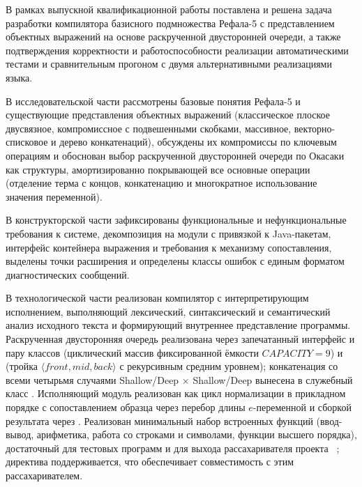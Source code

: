 В рамках выпускной квалификационной работы поставлена и решена задача
разработки компилятора базисного подмножества Рефала-5 с представлением
объектных выражений на основе раскрученной двусторонней очереди, а также
подтверждения корректности и работоспособности реализации автоматическими
тестами и сравнительным прогоном с двумя альтернативными реализациями
языка.

В исследовательской части рассмотрены базовые понятия Рефала-5 и
существующие представления объектных выражений (классическое плоское
двусвязное, компромиссное с подвешенными скобками, массивное,
векторно-списковое и дерево конкатенаций), обсуждены их компромиссы по
ключевым операциям и обоснован выбор раскрученной двусторонней очереди по
Окасаки~\cite{okasaki_pfds} как структуры, амортизированно покрывающей все
основные операции (отделение терма с концов, конкатенацию и многократное
использование значения переменной).

В конструкторской части зафиксированы функциональные и нефункциональные
требования к системе, декомпозиция на модули с привязкой к Java-пакетам,
интерфейс контейнера выражения и требования к механизму сопоставления, выделены
точки расширения и определены классы ошибок с единым форматом
диагностических сообщений.

В технологической части реализован компилятор с интерпретирующим исполнением,
выполняющий лексический,
синтаксический и семантический анализ исходного текста и формирующий
внутреннее представление программы. Раскрученная двусторонняя очередь
реализована через запечатанный интерфейс  и пару классов
 (циклический массив фиксированной ёмкости
\(CAPACITY=9\)) и  (тройка \(\langle front, mid, back
\rangle\) с рекурсивным средним уровнем); конкатенация со всеми четырьмя
случаями Shallow/Deep $\times$ Shallow/Deep вынесена в служебный класс
. Исполняющий модуль реализован как цикл нормализации в
прикладном порядке с сопоставлением образца через перебор длины
\(e\)-переменной и сборкой результата через . Реализован
минимальный набор встроенных функций (ввод-вывод, арифметика, работа со
строками и символами, функции высшего порядка), достаточный для тестовых
программ и для выхода рассахаривателя  проекта
~\cite{refal5_framework_github}; директива
 поддерживается, что обеспечивает совместимость с этим
рассахаривателем.

